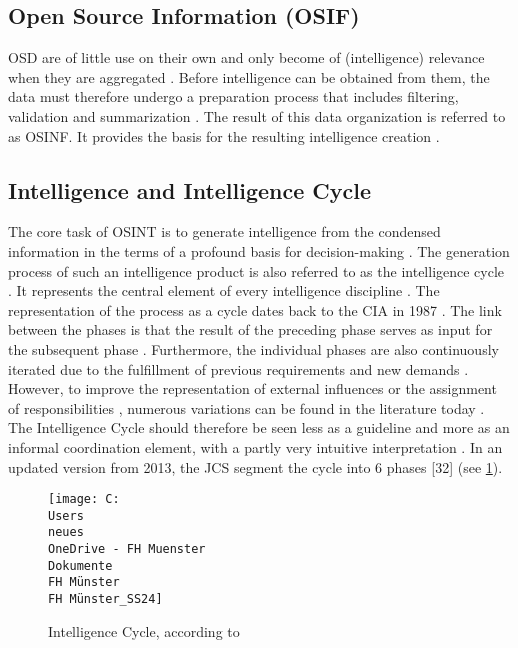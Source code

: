 \documentclass[10pt]{article}
\begin{document}
\subsection{Open Source Information (OSIF)}

OSD are of little use on their own and only become of (intelligence) relevance when they
are aggregated \cite{Williams.2018}. Before intelligence can be obtained from them, the
data must therefore undergo a preparation process that includes filtering, validation and
summarization \cite{DosPassos.2017, NorthAtlanticTreatyOrganization.2001}. The result of this
data organization \cite{Schaurer.2010} is referred to as OSINF. It provides the basis for the
resulting intelligence creation \cite{DosPassos.2017,Schaurer.2010}.

\subsection{Intelligence and Intelligence Cycle}

The core task of OSINT is to generate intelligence \cite{Hwang.2022,Dokman.2020}
from the condensed information in the terms of a profound basis for decision-making
\cite{Breakspear.2013,May.2020}. The generation process of such an intelligence product
is also referred to as the intelligence cycle \cite{HerreraCubides.2020, CentralIntelligenceAgency.1987}.
It represents the central element of every intelligence discipline \cite{Reuser.2017,Dokman.2020}.
The representation of the process as a cycle \cite{DirectorofNationalIntelligence.2011} dates
back to the CIA in 1987 \cite{CentralIntelligenceAgency.1987}. The link between the phases is that
the result of the preceding phase serves as input for the subsequent phase
\cite{JointChiefsofStaffU.S.Army.2013,Pellissier.2013}. Furthermore, the individual phases are also continuously
iterated due to the fulfillment of previous requirements and new demands \cite{Gibson.2016}.
However, to improve the representation of external influences or the
assignment of responsibilities \cite{Lowenthal.2020,Phythian.2013,Johnston.2005}, numerous
variations can be found in the literature today \cite{Bohm.2021,Reuser.2017}. The
Intelligence Cycle should therefore be seen less as a guideline and more as an informal
coordination element, with a partly very intuitive \cite{Breakspear.2013} interpretation
\cite{Hwang.2022}. In an updated version from 2013, the JCS segment the cycle into 6 phases [32] (see \ref{fig: intelligence cycle}).

\begin{figure}[thb]
    \usepackage{graphicx}
    \centering
    \texttt{[image: C:\\Users\\neues\\OneDrive - FH Muenster\\Dokumente\\FH Münster\\FH Münster\_SS24]}
    \caption{Intelligence Cycle, according to \cite{JointChiefsofStaffU.S.Army.2013}}
    \label{fig: intelligence cycle}
\end{figure}
\end{document}
